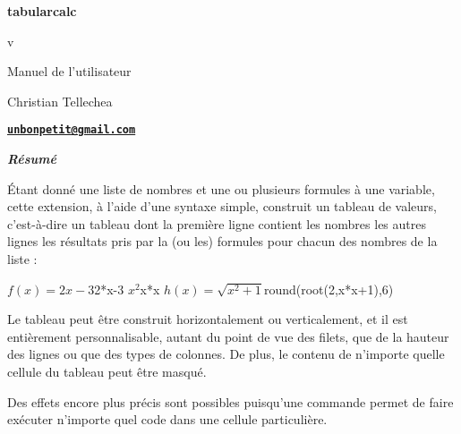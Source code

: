\documentclass[a4paper,10pt]{article}
\newcommand\tbcalc{\textsf{tabularcalc}\xspace}
\begin{document}
\setlength{\parindent}{0pt}
\begin{titlepage}
	\null\par\vfill
	\begin{center}
		\begin{minipage}{0.75\linewidth}
			\begin{center}
				\Huge\bfseries \tbcalc\par\vspace{5pt}
				\small v\tabularcalcversion\par\vspace{25pt}
				\normalsize Manuel de l'utilisateur
			\end{center}
		\end{minipage}
	\end{center}
	\vspace{1cm}
	\begin{center}
		Christian {\sc Tellechea}\par\small
		\href{mailto:unbonpetit@gmail.com}{\texttt{\textbf{unbonpetit@gmail.com}}}\par\vspace{5pt}
		\tabularcalcfrenchdate
	\end{center}
	\vfill\hrulefill
	\begin{center}
		\begin{minipage}{0.85\linewidth}
			\noindent
			\hfill\textbf{\textit{Résumé}}\hfill{}\medskip\par
				Étant donné une liste de nombres et une ou plusieurs formules à une variable, cette extension, à l'aide d'une syntaxe simple, construit un tableau de valeurs, c'est-à-dire un tableau dont la première ligne contient les nombres les autres lignes les résultats pris par la (ou les) formules pour chacun des nombres de la liste :
				\begin{center}
					\tcsethrule{\hline}{\hline\hline}{\hline}
					              {$f(x)=2x-3$}{2*x-3}
					              {$x^2$}{x*x}
					              {$h(x)=\sqrt{x^2+1}$}{round(root(2,x*x+1),6)}
				\end{center}
				Le tableau peut être construit horizontalement ou verticalement, et il est entièrement personnalisable, autant du point de vue des filets, que de la hauteur des lignes ou que des types de colonnes. De plus, le contenu de n'importe quelle cellule du tableau peut être masqué.\smallskip

				Des effets encore plus précis sont possibles puisqu'une commande permet de faire exécuter n'importe quel code dans une cellule particulière.
		\end{minipage}
	\end{center}
	\hrulefill\vfill{}
\end{titlepage}
\end{document}
